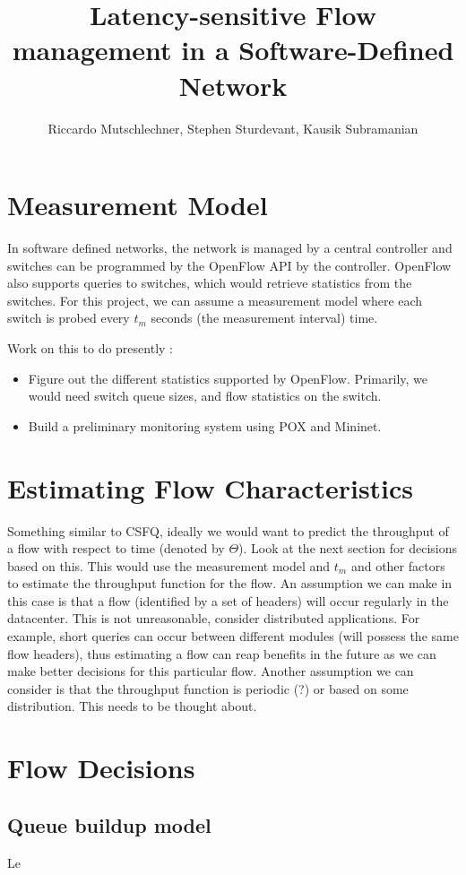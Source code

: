 \documentclass[]{article}
\title{Latency-sensitive Flow management in a Software-Defined Network}
\author{Riccardo Mutschlechner, Stephen Sturdevant, Kausik Subramanian}
\begin{document}
\maketitle

\section{Measurement Model}
In software defined networks, the network is managed by a central controller
and switches can be programmed by  the OpenFlow API by the controller. 
OpenFlow also supports queries to switches, which would retrieve statistics
from the switches. For this project, we can assume a measurement model
where each switch is probed every $t_m$ seconds (the measurement interval)
time. 

Work on this to do presently :
\begin{itemize}
	\item Figure out the different statistics supported by OpenFlow. Primarily, 
	we would need switch queue sizes, and flow statistics on the switch. 
	\item Build a preliminary monitoring system using POX and Mininet. 
\end{itemize}

\section{Estimating Flow Characteristics}
Something similar to CSFQ, ideally we would want to predict the throughput
of a flow with respect to time (denoted by $\Theta$). Look at the next section for decisions based on this. 
This would use the measurement model and $t_m$ and other factors to
estimate the throughput function for the flow. An assumption we can make
in this case is that a flow (identified by a set of headers) will occur 
regularly in the datacenter. This is not unreasonable, consider distributed applications.
For example, short queries can occur between different modules (will possess the
same flow headers), thus estimating a flow can reap benefits in the future as 
we can make better decisions for this particular flow. Another assumption we
can consider is that the throughput function is periodic (?) or based on
some distribution. This needs to be thought about. 

\section{Flow Decisions}
\subsection{Queue buildup model}
Le
\end{document}
